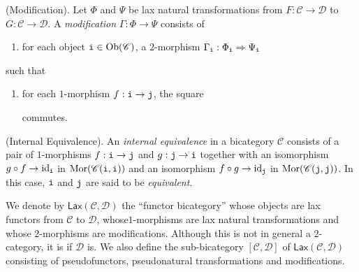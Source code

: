 \noindent\begin{definition}\textup{(Modification).} Let $\Phi$ and $\Psi$ be lax natural transformations from $F : \mathscr{C} \to \mathscr{D}$ to $G : \mathscr{C} \to \mathscr{D}$. A {\em modification} $\Gamma : \Phi \to \Psi$ consists of
\begin{enumerate}[label=$\bullet$, leftmargin=4\parindent]
\item for each object $\textnormal{\texttt{i}} \in \textnormal{Ob}(\mathscr{C})$, a $2$-morphism $\Gamma_{\textnormal{\texttt{i}}} : \Phi_{\textnormal{\texttt{i}}} \Rightarrow \Psi_{\textnormal{\texttt{i}}}$
\end{enumerate}
\noindent such that
\begin{enumerate}[label=$\bullet$, leftmargin=4\parindent]
\item for each $1$-morphism $f : \textnormal{\texttt{i}} \to \textnormal{\texttt{j}}$, the square
\begin{center}
\end{center}
commutes.\\
\end{enumerate}
\end{definition}

\noindent\begin{definition}\textup{(Internal Equivalence).} An {\em internal equivalence} in a bicategory $\mathscr{C}$ consists of a pair of $1$-morphisms $f : \textnormal{\texttt{i}} \to \textnormal{\texttt{j}}$ and $g : \textnormal{\texttt{j}} \to \textnormal{\texttt{i}}$ together with an isomorphism $g \circ f \to \textup{id}_{\textnormal{\texttt{i}}}$ in $\textnormal{Mor}(\mathscr{C}(\textnormal{\texttt{i}}, \textnormal{\texttt{i}}))$ and an isomorphism $f \circ g \to \textup{id}_{\textnormal{\texttt{j}}}$ in $\textnormal{Mor}(\mathscr{C}(\textnormal{\texttt{j}}, \textnormal{\texttt{j}}))$. In this case, $\textnormal{\texttt{i}}$ and $\textnormal{\texttt{j}}$ are said to be {\em equivalent}.\\
\end{definition}

\noindent We denote by $\textsf{Lax}(\mathscr{C}, \mathscr{D})$ the ``functor bicategory'' whose objects are lax functors from $\mathscr{C}$ to $\mathscr{D}$, whose\linebreak $1$-morphisms are lax natural transformations and whose $2$-morphisms are modifications. Although this is not in general a $2$-category, it is if $\mathscr{D}$ is. We also define the sub-bicategory $[\mathscr{C}, \mathscr{D}]$ of $\textsf{Lax}(\mathscr{C}, \mathscr{D})$ consisting of pseudofunctors, pseudonatural transformations and modifications.\\

